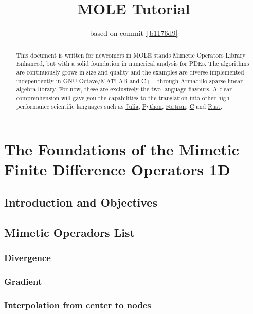 \documentclass[a4paper,abstract=true]{scrreprt}
\title{\color{DarkBlue}MOLE Tutorial}
\author{based on commit \href{https://github.com/csrc-sdsu/mole/tree/b1176d9969e807fb62bed8fee28bc0eb9648a93a}{\texttt|b1176d9|}}
\begin{document}
\maketitle

\begin{abstract}
    This document is written for newcomers in MOLE stands
    Mimetic Operators Library Enhanced, but with a solid foundation
    in numerical analysis for PDEs.
    The algorithms are continuously grows in size and quality and the
    examples are diverse implemented independently in
    \href{https://octave.org}{GNU Octave}/\href{https://www.mathworks.com/products/matlab.html}{MATLAB}
    and \href{https://isocpp.org}{C++} through Armadillo sparse
    linear algebra library.
    For now, these are exclusively the two language flavours.
    A clear comprenhension will gave you the capabilities to the translation
    into other high-performance scientific languages such as \href{https://julialang.org}{Julia},
    \href{https://www.python.org}{Python}, \href{https://fortran-lang.org}{Fortran}, \href{https://www.open-std.org/jtc1/sc22/wg14}{C}
    and \href{https://www.rust-lang.org}{Rust}.
\end{abstract}

\tableofcontents

\part{The Foundations of the Mimetic Finite Difference Operators 1D}

\chapter{Introduction and Objectives}

\chapter{Mimetic Operadors List}

\section{Divergence}

\section{Gradient}

\section{Interpolation from center to nodes}
\end{document}
